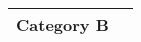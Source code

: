 \begin{tabularx}{\linewidth}{lX}
	\midrule
	\textbf{Category B}                &                                                                                                                                                                                                                                                                 \\
	\midrule
\end{tabularx}



